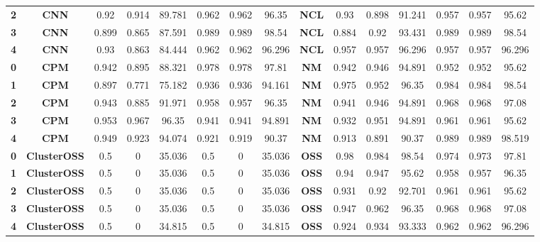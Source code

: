 {{\begin{tabular}{c|c|cccccc|ccccccc}
\textbf{2} & \textbf{CNN} & 0.92  & 0.914 & 89.781 & 0.962 & 0.962 & 96.35 & \multicolumn{1}{c|}{\textbf{NCL}} & 0.93  & 0.898 & 91.241 & 0.957 & 0.957 & 95.62 \\
\textbf{3} & \textbf{CNN} & 0.899 & 0.865 & 87.591 & 0.989 & 0.989 & 98.54 & \multicolumn{1}{c|}{\textbf{NCL}} & 0.884 & 0.92  & 93.431 & 0.989 & 0.989 & 98.54 \\
\textbf{4} & \textbf{CNN} & 0.93  & 0.863 & 84.444 & 0.962 & 0.962 & 96.296 & \multicolumn{1}{c|}{\textbf{NCL}} & 0.957 & 0.957 & 96.296 & 0.957 & 0.957 & 96.296 \\
\textbf{0} & \textbf{CPM} & 0.942 & 0.895 & 88.321 & 0.978 & 0.978 & 97.81 & \multicolumn{1}{c|}{\textbf{NM}} & 0.942 & 0.946 & 94.891 & 0.952 & 0.952 & 95.62 \\
\textbf{1} & \textbf{CPM} & 0.897 & 0.771 & 75.182 & 0.936 & 0.936 & 94.161 & \multicolumn{1}{c|}{\textbf{NM}} & 0.975 & 0.952 & 96.35 & 0.984 & 0.984 & 98.54 \\
\textbf{2} & \textbf{CPM} & 0.943 & 0.885 & 91.971 & 0.958 & 0.957 & 96.35 & \multicolumn{1}{c|}{\textbf{NM}} & 0.941 & 0.946 & 94.891 & 0.968 & 0.968 & 97.08 \\
\textbf{3} & \textbf{CPM} & 0.953 & 0.967 & 96.35 & 0.941 & 0.941 & 94.891 & \multicolumn{1}{c|}{\textbf{NM}} & 0.932 & 0.951 & 94.891 & 0.961 & 0.961 & 95.62 \\
\textbf{4} & \textbf{CPM} & 0.949 & 0.923 & 94.074 & 0.921 & 0.919 & 90.37 & \multicolumn{1}{c|}{\textbf{NM}} & 0.913 & 0.891 & 90.37 & 0.989 & 0.989 & 98.519 \\
\textbf{0} & \textbf{ClusterOSS} & 0.5   & 0     & 35.036 & 0.5   & 0     & 35.036 & \multicolumn{1}{c|}{\textbf{OSS}} & 0.98  & 0.984 & 98.54 & 0.974 & 0.973 & 97.81 \\
\textbf{1} & \textbf{ClusterOSS} & 0.5   & 0     & 35.036 & 0.5   & 0     & 35.036 & \multicolumn{1}{c|}{\textbf{OSS}} & 0.94  & 0.947 & 95.62 & 0.958 & 0.957 & 96.35 \\
\textbf{2} & \textbf{ClusterOSS} & 0.5   & 0     & 35.036 & 0.5   & 0     & 35.036 & \multicolumn{1}{c|}{\textbf{OSS}} & 0.931 & 0.92  & 92.701 & 0.961 & 0.961 & 95.62 \\
\textbf{3} & \textbf{ClusterOSS} & 0.5   & 0     & 35.036 & 0.5   & 0     & 35.036 & \multicolumn{1}{c|}{\textbf{OSS}} & 0.947 & 0.962 & 96.35 & 0.968 & 0.968 & 97.08 \\
\textbf{4} & \textbf{ClusterOSS} & 0.5   & 0     & 34.815 & 0.5   & 0     & 34.815 & \multicolumn{1}{c|}{\textbf{OSS}} & 0.924 & 0.934 & 93.333 & 0.962 & 0.962 & 96.296 \\

\end{tabular}}}
